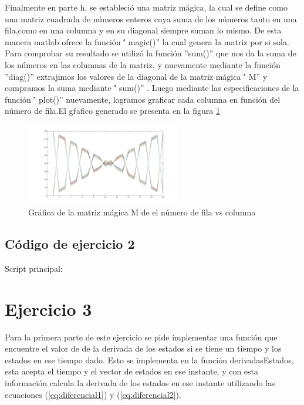 \documentclass[12pt,letterpaper]{article}
\begin{document}
Finalmente en parte h, se estableció una matriz mágica, la cual se define como una matriz cuadrada de números enteros cuya suma de los números tanto en una fila,como en una columna y en su diagonal siempre suman lo mismo. De esta manera matlab ofrece la función \'' magic()'' la cual genera la matriz por si sola. Para comprobar su resultado se utilizó la función ''sum()'' que nos da la suma de los números en las columnas de la matriz, y nuevamente mediante la función ''diag()'' extrajimos los valores de la diagonal de la matriz mágica \'' M'' y compramos la suma mediante \'' sum()'' . Luego mediante las especificaciones de la función \'' plot()'' nuevamente, logramos graficar cada columna en función del número de fila.El gŕafico generado se presenta en la figura \ref{fig:magical}

\begin{figure}[ht!]
	\centering
	\includegraphics[width=0.6\textwidth]{pictures/Ejercicio2/magic_matrix.jpg}
	\caption{Gráfica de la matriz mágica M de el número de fila vs columna}
	\label{fig:magical}
\end{figure} 


\subsection{Código de ejercicio 2}

Script principal:



\section{Ejercicio 3}

Para la primera parte de este ejercicio se pide implementar una función  que encuentre el valor de de la derivada de los estados si se tiene un tiempo y los estados en ese tiempo dado. Esto se implementa en la función derivadasEstados, esta acepta el tiempo y el vector de estados en ese instante, y con esta información calcula la derivada de los estados en ese instante utilizando las ecuaciones (\ref{eq:diferencial1}) y (\ref{eq:diferencial2}). 
\end{document}
